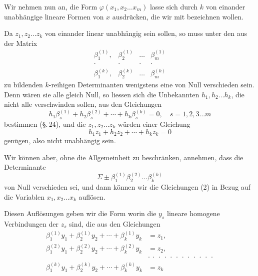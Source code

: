Wir nehmen nun an, die Form $\varphi(x_1, x_2 \ldots x_m)$ lasse sich
durch $k$ von einander unabhängige lineare Formen von $x$ aus\-drücken,
die wir mit
bezeichnen wollen.

Da $z_1, z_2 \ldots z_k$ von einander linear unabhängig sein sollen, so
muss unter den aus der Matrix
\[
\begin{matrix}
\beta_1^{(1)}, & \beta_2^{(1)} & \ldots & \beta_m^{(1)} \\
\cdot & \cdot & \cdot & \cdot \\
\beta_1^{(k)}, & \beta_2^{(k)} & \ldots & \beta_m^{(k)}
\end{matrix}
\]
zu bildenden $k$-reihigen Determinanten wenigstens eine von Null
verschieden sein. Denn wären sie alle gleich Null, so liessen
sich die Unbekannten $h_1, h_2 \ldots h_k$, die nicht alle verschwinden
sollen, aus den Gleichungen
\[
h_1 \beta_s^{(1)} + h_2 \beta_s^{(2)} + \cdots + h_k \beta_s^{(k)} = 0, \quad s = 1, 2, 3 \ldots m
\]
bestimmen (\S.\,24), und die $z_1, z_2 \ldots z_k$ würden einer Gleichung
\[
h_1 z_1 + h_2 z_2 + \cdots + h_k z_k = 0
\]
genügen, also nicht unabhängig sein.

Wir können aber, ohne die Allgemeinheit zu beschränken, an\-nehmen,
dass die Determinante
\[
\Sigma \pm \beta_1^{(1)}\beta_2^{(2)} \ldots \beta_k^{(k)}
\]
von Null verschieden sei, und dann können wir die Gleichungen
(2) in Bezug auf die Variablen $x_1, x_2 \ldots x_k$ auflösen.

Diesen Auflösungen geben wir die Form
worin die $y_s$ lineare homogene Verbindungen der $z_s$ sind, die
aus den Gleichungen
\[
\begin{aligned}
\beta_1^{(1)}y_1 + \beta_2^{(1)}y_2 + \cdots + \beta_k^{(1)}y_k &= z_1, \\
\beta_1^{(2)}y_1 + \beta_2^{(2)}y_2 + \cdots + \beta_k^{(2)}y_k &= z_2, \\
&\cdot\ \cdot\ \cdot\ \cdot\ \cdot\ \cdot\ \cdot\ \cdot\ \cdot\ \cdot\ \cdot\ \cdot \\
\beta_1^{(k)}y_1 + \beta_2^{(k)}y_2 + \cdots + \beta_k^{(k)}y_k &= z_k
\end{aligned}
\]
